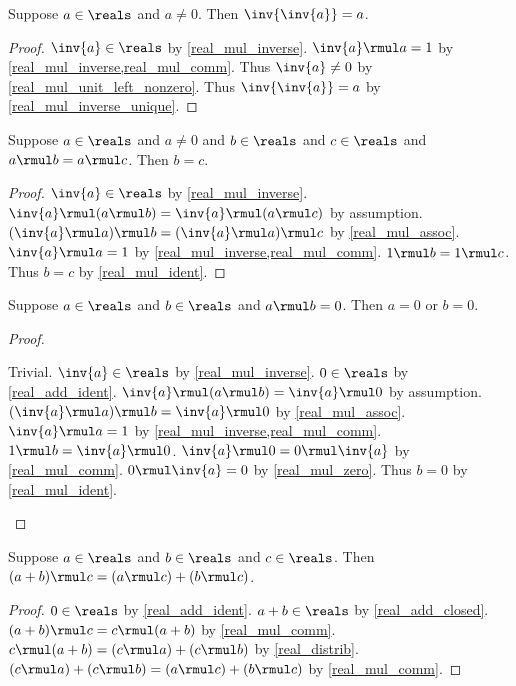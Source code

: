 \begin{theorem}\label{real_inv_inv}
    Suppose $a\in\reals$ and $a\neq 0$.
    Then $\inv{\inv{a}} = a$.
\end{theorem}
\begin{proof}
    $\inv{a}\in\reals$ by \cref{real_mul_inverse}.
    $\inv{a} \rmul a = 1$ by \cref{real_mul_inverse,real_mul_comm}.
    Thus $\inv{a} \neq 0$ by \cref{real_mul_unit_left_nonzero}.
    Thus $\inv{\inv{a}} = a$ by \cref{real_mul_inverse_unique}.
\end{proof}

\begin{theorem}\label{real_mul_cancel}
    Suppose $a\in\reals$ and $a\neq 0$ and $b\in\reals$ and $c\in\reals$ and $a \rmul b = a \rmul c$.
    Then $b = c$.
\end{theorem}
\begin{proof}
    $\inv{a}\in\reals$ by \cref{real_mul_inverse}.
    $\inv{a} \rmul (a \rmul b) = \inv{a} \rmul (a \rmul c)$ by assumption.
    $(\inv{a} \rmul a) \rmul b = (\inv{a} \rmul a) \rmul c$ by \cref{real_mul_assoc}.
    $\inv{a} \rmul a = 1$ by \cref{real_mul_inverse,real_mul_comm}.
    $1 \rmul b = 1 \rmul c$.
    Thus $b = c$ by \cref{real_mul_ident}.
\end{proof}

\begin{theorem}\label{real_mul_zero_product}
    Suppose $a\in\reals$ and $b\in\reals$ and $a \rmul b = 0$.
    Then $a = 0$ or $b = 0$.
\end{theorem}
\begin{proof}
    \begin{byCase}
     Trivial.
        $\inv{a}\in\reals$ by \cref{real_mul_inverse}.
        $0\in\reals$ by \cref{real_add_ident}.
        $\inv{a} \rmul (a \rmul b) = \inv{a} \rmul 0$ by assumption.
        $(\inv{a} \rmul a) \rmul b = \inv{a} \rmul 0$ by \cref{real_mul_assoc}.
        $\inv{a} \rmul a = 1$ by \cref{real_mul_inverse,real_mul_comm}.
        $1 \rmul b = \inv{a} \rmul 0$.
        $\inv{a} \rmul 0 = 0 \rmul \inv{a}$ by \cref{real_mul_comm}.
        $0 \rmul \inv{a} = 0$ by \cref{real_mul_zero}.
        Thus $b = 0$ by \cref{real_mul_ident}.
    \end{byCase}
\end{proof}


\begin{lemma}\label{real_right_distrib}
    Suppose $a\in\reals$ and $b\in\reals$ and $c\in\reals$.
    Then $(a + b) \rmul c = (a \rmul c) + (b \rmul c)$.
\end{lemma}
\begin{proof}
    $0\in\reals$ by \cref{real_add_ident}.
    $a + b\in\reals$ by \cref{real_add_closed}.
    $(a + b) \rmul c = c \rmul (a + b)$ by \cref{real_mul_comm}.
    $c \rmul (a + b) = (c \rmul a) + (c \rmul b)$ by \cref{real_distrib}.
    $(c \rmul a) + (c \rmul b) = (a \rmul c) + (b \rmul c)$ by \cref{real_mul_comm}.
\end{proof}

